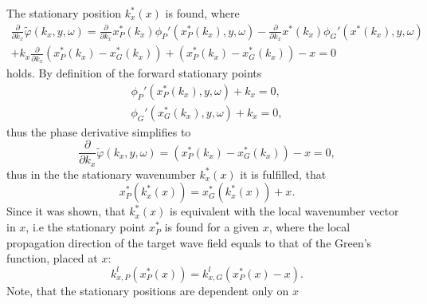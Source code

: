 \documentclass[12pt,a4paper]{article}
\begin{document}
The stationary position $k_x^*(x)$ is found, where
\begin{multline}
\frac{\partial}{\partial k_x}
\tilde{\varphi}(k_x,y,\omega) = \frac{\partial}{\partial k_x}x_P^*(k_x) \phi_P'(x_P^*(k_x),y,\omega) -  \frac{\partial}{\partial k_x} x^*(k_x)\phi_G'(x^*(k_x),y,\omega) \\ + k_x \frac{\partial}{\partial k_x}\left( x_P^*(k_x) - x_G^*(k_x) \right) + \left( x_P^*(k_x) - x_G^*(k_x) \right) -  x = 0
\end{multline}
holds.
By definition of the forward stationary points
\begin{eqnarray}
\phi_P'(x_P^*(k_x),y,\omega) + k_x = 0,\\
\phi_G'(x_G^*(k_x),y,\omega) + k_x = 0,
\label{Forward_spa}
\end{eqnarray}
thus the phase derivative simplifies to
\begin{equation}
\frac{\partial}{\partial k_x}
\tilde{\varphi}(k_x,y,\omega) = \left( x_P^*(k_x) - x_G^*(k_x) \right) -  x = 0,
\end{equation}
thus in the the stationary wavenumber $k_x^*(x)$ it is fulfilled, that 
\begin{equation}
x_P^*(k_x^*(x)) = x_G^*(k_x^*(x)) + x.
\end{equation}
Since it was shown, that $k_x^*(x)$ is equivalent with the local wavenumber vector in $x$, i.e the stationary point $x^*_P$ is found for a given $x$, where the local propagation direction of the target wave field equals to that of the Green's function, placed at $x$:
\begin{equation}
k_{x,P}^l (x_P^*(x)) = k_{x,G}^l(x_P^*(x) - x). 
\end{equation}
Note, that the stationary positions are dependent only on $x$
\end{document}
